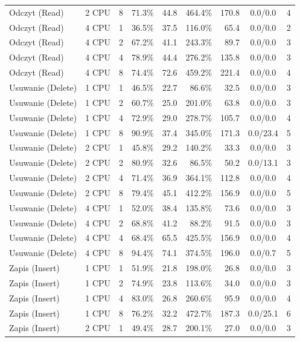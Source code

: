 \begin{table}[ht]
{\begin{tabular}{llcrrrrcc}
Odczyt (Read) & 2 CPU & 8 & 71.3\% & 44.8 & 464.4\% & 170.8 & 0.0/0.0 & 4 \\
Odczyt (Read) & 4 CPU & 1 & 36.5\% & 37.5 & 116.0\% & 65.4 & 0.0/0.0 & 2 \\
Odczyt (Read) & 4 CPU & 2 & 67.2\% & 41.1 & 243.3\% & 89.7 & 0.0/0.0 & 3 \\
Odczyt (Read) & 4 CPU & 4 & 78.9\% & 44.4 & 276.2\% & 135.8 & 0.0/0.0 & 3 \\
Odczyt (Read) & 4 CPU & 8 & 74.4\% & 72.6 & 459.2\% & 221.4 & 0.0/0.0 & 4 \\
Usuwanie (Delete) & 1 CPU & 1 & 46.5\% & 22.7 & 86.6\% & 32.5 & 0.0/0.0 & 3 \\
Usuwanie (Delete) & 1 CPU & 2 & 60.7\% & 25.0 & 201.0\% & 63.8 & 0.0/0.0 & 3 \\
Usuwanie (Delete) & 1 CPU & 4 & 72.9\% & 29.0 & 278.7\% & 105.7 & 0.0/0.0 & 4 \\
Usuwanie (Delete) & 1 CPU & 8 & 90.9\% & 37.4 & 345.0\% & 171.3 & 0.0/23.4 & 5 \\
Usuwanie (Delete) & 2 CPU & 1 & 45.8\% & 29.2 & 140.2\% & 33.3 & 0.0/0.0 & 3 \\
Usuwanie (Delete) & 2 CPU & 2 & 80.9\% & 32.6 & 86.5\% & 50.2 & 0.0/13.1 & 3 \\
Usuwanie (Delete) & 2 CPU & 4 & 71.4\% & 36.9 & 364.1\% & 112.8 & 0.0/0.0 & 4 \\
Usuwanie (Delete) & 2 CPU & 8 & 79.4\% & 45.1 & 412.2\% & 156.9 & 0.0/0.0 & 5 \\
Usuwanie (Delete) & 4 CPU & 1 & 52.0\% & 38.4 & 135.8\% & 73.6 & 0.0/0.0 & 3 \\
Usuwanie (Delete) & 4 CPU & 2 & 68.8\% & 41.2 & 88.2\% & 91.5 & 0.0/0.0 & 3 \\
Usuwanie (Delete) & 4 CPU & 4 & 68.4\% & 65.5 & 425.5\% & 156.9 & 0.0/0.0 & 4 \\
Usuwanie (Delete) & 4 CPU & 8 & 94.4\% & 74.1 & 374.5\% & 196.0 & 0.0/0.7 & 5 \\
Zapis (Insert) & 1 CPU & 1 & 51.9\% & 21.8 & 198.0\% & 26.8 & 0.0/0.0 & 3 \\
Zapis (Insert) & 1 CPU & 2 & 74.9\% & 23.8 & 113.6\% & 34.0 & 0.0/0.0 & 3 \\
Zapis (Insert) & 1 CPU & 4 & 83.0\% & 26.8 & 260.6\% & 95.9 & 0.0/0.0 & 4 \\
Zapis (Insert) & 1 CPU & 8 & 76.2\% & 32.2 & 472.7\% & 187.3 & 0.0/25.1 & 6 \\
Zapis (Insert) & 2 CPU & 1 & 49.4\% & 28.7 & 200.1\% & 27.0 & 0.0/0.0 & 3 \\

\end{tabular}}
\end{table}
